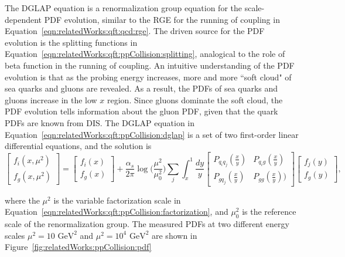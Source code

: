 \noindent The DGLAP equation is a renormalization group equation for the scale-dependent PDF evolution, similar to the RGE for the running of coupling in Equation~\ref{eqn:relatedWorks:qft:qcd:rge}. The driven source for the PDF evolution is the splitting functions in Equation~\ref{eqn:relatedWorks:qft:ppCollision:splitting}, analogical to the role of beta function in the running of coupling.  An intuitive understanding of the PDF evolution is that as the probing energy increases, more and more ``soft cloud" of sea quarks and gluons are revealed. As a result, the PDFs of sea quarks and gluons increase in the low $x$ region. Since gluons dominate the soft cloud, the PDF evolution tells information about the gluon PDF, given that the quark PDFs are known from DIS. The DGLAP equation in Equation~\ref{eqn:relatedWorks:qft:ppCollision:dglap} is a set of two first-order linear differential equations, and the solution is
\begin{equation}
    \begin{bmatrix} f_i(x,\mu^2) \\ f_g(x,\mu^2) \end{bmatrix} = \begin{bmatrix} f_i(x) \\ f_g(x) \end{bmatrix} + 
    \frac{\alpha_s}{2\pi} \log\bigg(\frac{\mu^2}{\mu_0^2}\bigg) 
    \sum_j \int_x^1 
    \frac{dy}{y}
    \begin{bmatrix} P_{q_i q_j}(\frac{x}{y}) & P_{q_i g}(\frac{x}{y}) \\ P_{g q_j}(\frac{x}{y}) & P_{gg}(\frac{x}{y})) \end{bmatrix} \begin{bmatrix} f_j(y) \\ f_g(y) \end{bmatrix}  , 
\end{equation}

\noindent where the $\mu^2$ is the variable factorization scale in Equation~\ref{eqn:relatedWorks:qft:ppCollision:factorization}, and $\mu^2_0$ is the reference scale of the renormalization group. The measured PDFs at two different energy scales  $\mu^2=10 \text{ GeV}^2$ and $\mu^2=10^4 \text{ GeV}^2$ are shown in Figure~\ref{fig:relatedWorks:ppCollision:pdf}


